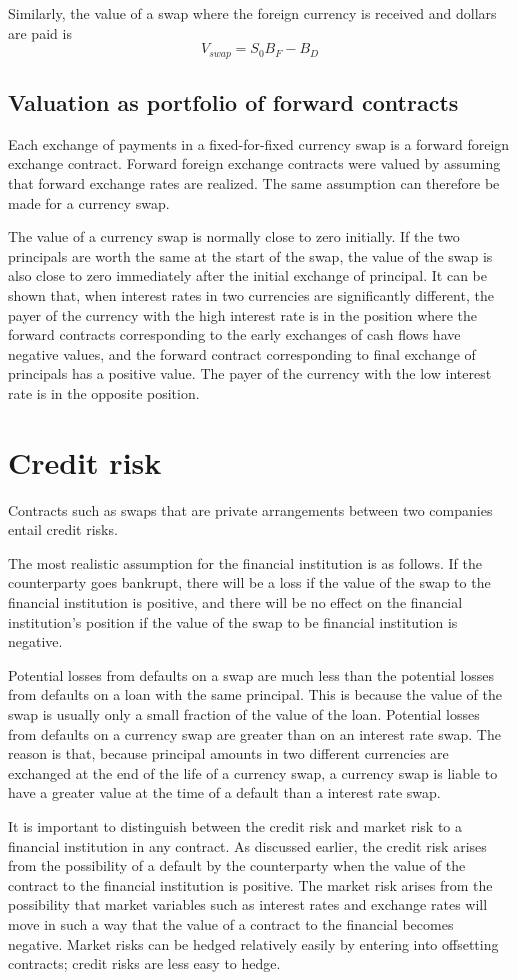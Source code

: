 \documentclass{article}
\begin{document}
Similarly, the value of a swap where the foreign currency is received and dollars are paid is 
\[
V_{swap}=S_0B_F-B_D
\]

\subsection{Valuation as portfolio of forward contracts}
Each exchange of payments in a fixed-for-fixed currency swap is a forward foreign exchange contract. Forward foreign exchange contracts were valued by assuming that forward exchange rates are realized. The same assumption can therefore be made for a currency swap.

The value of a currency swap is normally close to zero initially. If the two principals are worth the same at the start of the swap, the value of the swap is also close to zero immediately after the initial exchange of principal. It can be shown that, when interest rates in two currencies are significantly different, the payer of the currency with the high interest rate is in the position where the forward contracts corresponding to the early exchanges of cash flows have negative values, and the forward contract corresponding to final exchange of principals has a positive value. The payer of the currency with the low interest rate is in the opposite position.

\section{Credit risk}
Contracts such as swaps that are private arrangements between two companies entail credit risks.

The most realistic assumption for the financial institution is as follows. If the counterparty goes bankrupt, there will be a loss if the value of the swap to the financial institution is positive, and there will be no effect on the financial institution's position if the value of the swap to be financial institution is negative.

Potential losses from defaults on a swap are much less than the potential losses from defaults on a loan with the same principal. This is because the value of the swap is usually only a small fraction of the value of the loan. Potential losses from defaults on a currency swap are greater than on an interest rate swap. The reason is that, because principal amounts in two different currencies are exchanged at the end of the life of a currency swap, a currency swap is liable to have a greater value at the time of a default than a interest rate swap.

It is important to distinguish between the credit risk and market risk to a financial institution in any contract. As discussed earlier, the credit risk arises from the possibility of a default by the counterparty when the value of the contract to the financial institution is positive. The market risk arises from the possibility that market variables such as interest rates and exchange rates will move in such a way that the value of a contract to the financial becomes negative. Market risks can be hedged relatively easily by entering into offsetting contracts; credit risks are less easy to hedge.
\end{document}
